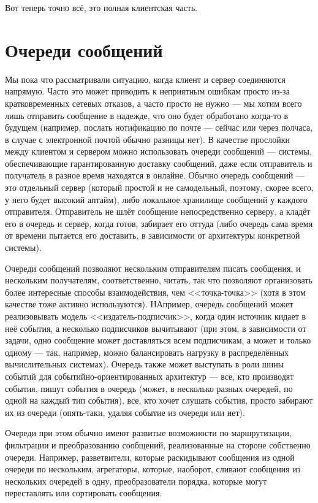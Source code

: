 \documentclass[a5paper]{article}
\begin{document}
Вот теперь точно всё, это полная клиентская часть.

\section{Очереди сообщений}

Мы пока что рассматривали ситуацию, когда клиент и сервер соединяются напрямую. Часто это может приводить к неприятным ошибкам просто из-за кратковременных сетевых отказов, а часто просто не нужно --- мы хотим всего лишь отправить сообщение в надежде, что оно будет обработано когда-то в будущем (например, послать нотификацию по почте --- сейчас или через полчаса, в случае с электронной почтой обычно разницы нет). В качестве прослойки между клиентом и сервером можно использовать очереди сообщений --- системы, обеспечивающие гарантированную доставку сообщений, даже если отправитель и получатель в разное время находятся в онлайне. Обычно очередь сообщений --- это отдельный сервер (который простой и не самодельный, поэтому, скорее всего, у него будет высокий аптайм), либо локальное хранилище сообщений у каждого отправителя. Отправитель не шлёт сообщение непосредственно серверу, а кладёт его в очередь и сервер, когда готов, забирает его оттуда (либо очередь сама время от времени пытается его доставить, в зависимости от архитектуры конкретной системы).

Очереди сообщений позволяют нескольким отправителям писать сообщения, и нескольким получателям, соответственно, читать, так что позволяют организовать более интересные способы взаимодействия, чем <<точка-точка>> (хотя в этом качестве тоже активно используются). НАпример, очередь сообщений может реализовывать модель <<издатель-подписчик>>, когда один источник кидает в неё события, а несколько подписчиков вычитывают (при этом, в зависимости от задачи, одно сообщение может доставляться всем подписчикам, а может и только одному --- так, например, можно балансировать нагрузку в распределённых вычислительных системах). Очередь также может выступать в роли шины событий для событийно-ориентированных архитектур --- все, кто производят события, пишут события в очередь (может, в несколько разных очередей, по одной на каждый тип события), все, кто хочет слушать события, просто забирают их из очереди (опять-таки, удаляя событие из очереди или нет).

Очереди при этом обычно имеют развитые возможности по маршрутизации, фильтрации и преобразованию сообщений, реализованные на стороне собственно очереди. Например, разветвители, которые раскидывают сообщения из одной очереди по нескольким, агрегаторы, которые, наоборот, сливают сообщения из нескольких очередей в одну, преобразователи порядка, которые могут переставлять или сортировать сообщения.
\end{document}
